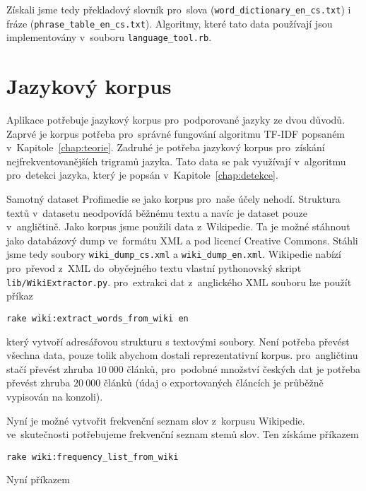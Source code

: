 Získali jsme tedy překladový slovník pro~slova (\lstinline{word_dictionary_en_cs.txt}) i fráze (\lstinline{phrase_table_en_cs.txt}). Algoritmy, které tato data používají jsou implementovány v~souboru \lstinline{language_tool.rb}.

\section{Jazykový korpus}
\label{subsec:zprovozneni_korpus}

Aplikace potřebuje jazykový korpus pro~podporované jazyky ze dvou důvodů. Zaprvé je korpus potřeba pro~správné fungování algoritmu TF-IDF popsaném v~Kapitole~\ref{chap:teorie}. Zadruhé je potřeba jazykový korpus pro~získání nejfrekventovanějších trigramů jazyka. Tato data se pak využívají v~algoritmu pro~detekci jazyka, který je popsán v~Kapitole~\ref{chap:detekce}.



Samotný dataset Profimedie se jako korpus pro~naše účely nehodí. Struktura textů v~datasetu neodpovídá běžnému textu a navíc je dataset pouze v~angličtině. Jako korpus jsme použili data z~Wikipedie. Ta je možné stáhnout jako databázový dump ve~formátu XML a pod licencí Creative Commons. Stáhli jsme tedy soubory \lstinline{wiki_dump_cs.xml} a \lstinline{wiki_dump_en.xml}. Wikipedie nabízí pro~převod z~XML do~obyčejného textu vlastní pythonovský skript \lstinline{lib/WikiExtractor.py}\cite{wikiextractor}. pro~extrakci dat z~anglického XML souboru lze použít příkaz

\begin{lstlisting}
rake wiki:extract_words_from_wiki en
\end{lstlisting}

který vytvoří adresářovou strukturu s textovými soubory. Není potřeba převést všechna data, pouze tolik abychom dostali reprezentativní korpus. pro~angličtinu stačí převést zhruba $10\ 000$ článků, pro~podobné množství českých dat je potřeba převést zhruba $20\ 000$ článků (údaj o exportovaných článcích je průběžně vypisován na konzoli).

Nyní je možné vytvořit frekvenční seznam slov z~korpusu Wikipedie. ve~skutečnosti potřebujeme frekvenční seznam stemů slov. Ten získáme příkazem

\begin{lstlisting}
rake wiki:frequency_list_from_wiki
\end{lstlisting}

Nyní příkazem

